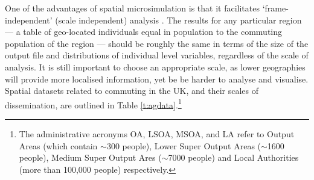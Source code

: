 One of the advantages of spatial microsimulation is that it facilitates
`frame-independent' (scale independent) analysis \citep{Horner2002}. The
results for any particular region --- a table of geo-located individuals equal
in population to the commuting population of the region --- should be roughly
the same in terms of the size of the output file and distributions of
individual level variables, regardless of the scale of analysis. It is
still important to choose an appropriate scale, as lower
geographies will provide more localised information, yet be be harder
to analyse and visualise. 
Spatial datasets related to commuting in the UK, and their scales of
dissemination, are outlined
in Table \ref{t:agdata}.\footnote{The administrative acronyms OA, LSOA,
MSOA, and LA refer to Output Areas (which contain $\sim$300 people),
Lower Super Output Areas ($\sim$1600 people), Medium Super Output Ares
($\sim$7000 people) and Local Authorities (more than 100,000 people)
respectively.}


